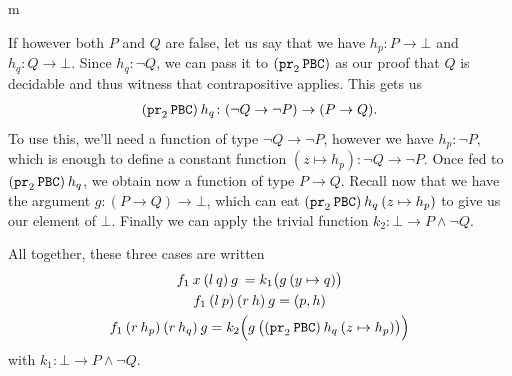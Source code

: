 \documentclass[11pt]{article}
\begin{document}
\begin{my proof}{m}
\begin{itemize}
If however both $P$ and $Q$ are false, let us say that we have $h_p \colon P \to \bot$ and $h_q \colon Q \to \bot$. Since $h_q \colon \neg Q$, we can pass it to $(\mathtt{pr}_2 \hspace{0.2em} \mathtt{PBC})$ as our proof that $Q$ is decidable and thus witness that contrapositive applies. This gets us \begin{gather*}
(\mathtt{pr}_2 \hspace{0.2em} \mathtt{PBC}) \hspace{0.2em} h_q \colon (\neg Q \to \neg P ) \to (P \to Q).
\end{gather*}
To use this, we'll need a function of type $\neg Q \to \neg P$, however we have $h_p \colon \neg P$, which is enough to define a constant function $(z \mapsto h_p) \colon \neg Q \to \neg P$. Once fed to $(\mathtt{pr}_2 \hspace{0.2em} \mathtt{PBC}) \hspace{0.2em} h_q$, we obtain now a function of type $P \to Q$. Recall now that we have the argument $g \colon (P \to Q) \to \bot$, which can eat $(\mathtt{pr}_2 \hspace{0.2em} \mathtt{PBC}) \hspace{0.2em} h_q \hspace{0.2em} (z \mapsto h_p)$ to give us our element of $\bot$. Finally we can apply the trivial function $k_2 \colon \bot \to P \wedge \neg Q$.

All together, these three cases are written \begin{gather*}
f_1 \hspace{0.2em} x \hspace{0.2em} (l \hspace{0.2em} q) \hspace{0.2em} g \hspace{0.2em} = k_1 \big( g \hspace{0.2em} (y \mapsto q) \big) \\
f_1 \hspace{0.2em} (l \hspace{0.2em} p) \hspace{0.2em} (r \hspace{0.2em} h) \hspace{0.2em} g = (p, h) \\
f_1 \hspace{0.2em} (r \hspace{0.2em} h_p) \hspace{0.2em} (r \hspace{0.2em} h_q) \hspace{0.2em} g = k_2 \Big( g \hspace{0.2em} \big((\mathtt{pr}_2 \hspace{0.2em} \mathtt{PBC}) \hspace{0.2em} h_q \hspace{0.2em} (z \mapsto h_p) \big) \Big)
\end{gather*}
with $k_1 \colon \bot \to P \wedge \neg Q$.


\end{itemize}
\end{my proof}
\end{document}

